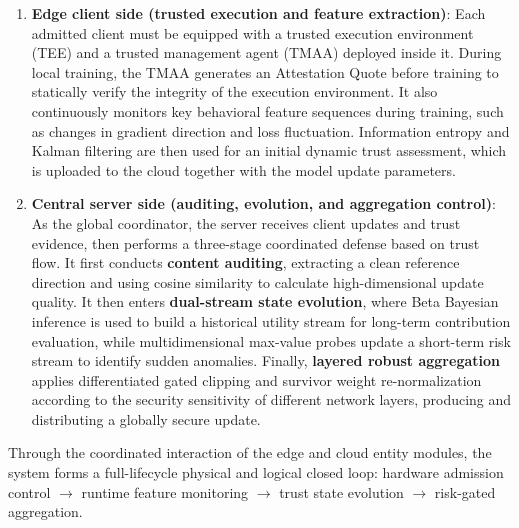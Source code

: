 \documentclass[final,5p,times,twocolumn]{elsarticle/elsarticle}
\newenvironment{tightenumerate}{%
  \begin{enumerate}\setlength{\itemsep}{1pt}\setlength{\parskip}{0pt}\setlength{\parsep}{0pt}}{\end{enumerate}}
\begin{document}
\begin{tightenumerate}
    \item \textbf{Edge client side (trusted execution and feature extraction)}: Each admitted client must be equipped with a trusted execution environment (TEE) and a trusted management agent (TMAA) deployed inside it. During local training, the TMAA generates an Attestation Quote before training to statically verify the integrity of the execution environment. It also continuously monitors key behavioral feature sequences during training, such as changes in gradient direction and loss fluctuation. Information entropy and Kalman filtering are then used for an initial dynamic trust assessment, which is uploaded to the cloud together with the model update parameters.

    \item \textbf{Central server side (auditing, evolution, and aggregation control)}: As the global coordinator, the server receives client updates and trust evidence, then performs a three-stage coordinated defense based on trust flow. It first conducts \textbf{content auditing}, extracting a clean reference direction and using cosine similarity to calculate high-dimensional update quality. It then enters \textbf{dual-stream state evolution}, where Beta Bayesian inference is used to build a historical utility stream for long-term contribution evaluation, while multidimensional max-value probes update a short-term risk stream to identify sudden anomalies. Finally, \textbf{layered robust aggregation} applies differentiated gated clipping and survivor weight re-normalization according to the security sensitivity of different network layers, producing and distributing a globally secure update.
\end{tightenumerate}

Through the coordinated interaction of the edge and cloud entity modules, the system forms a full-lifecycle physical and logical closed loop: hardware admission control $\to$ runtime feature monitoring $\to$ trust state evolution $\to$ risk-gated aggregation.
\end{document}
